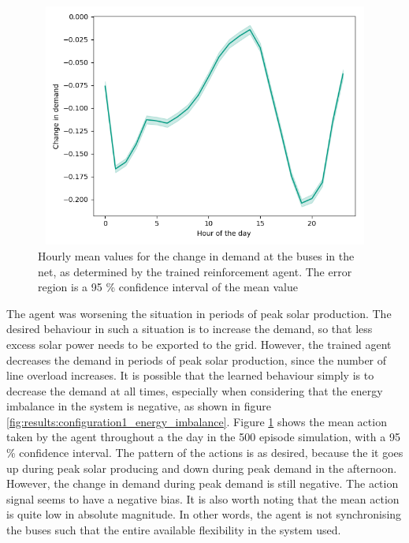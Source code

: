 \documentclass[class=book, crop=false, 11pt]{standalone}
\begin{document}
\begin{figure}[h]
    \center
\includegraphics[height=8cm, width=12cm]{figures/config1_action_hour.png}
    \caption[size = 9]{Hourly mean values for the change in demand at the buses in the net, as determined by the trained reinforcement agent. The error region is a 95 \% confidence interval of the mean value}
    \label{fig:discussion:config1_action_hour}
\end{figure}

The agent was worsening the situation in periods of peak solar production. The desired behaviour in such a situation is to increase the demand, so that less excess solar power needs to be exported to the grid. However, the trained agent decreases the demand in periods of peak solar production, since the number of line overload increases. It is possible that the learned behaviour simply is to decrease the demand at all times, especially when considering that the energy imbalance in the system is negative, as shown in figure \ref{fig:results:configuration1_energy_imbalance}. Figure \ref{fig:discussion:config1_action_hour} shows the mean action taken by the agent throughout a the day in the 500 episode simulation, with a 95 \% confidence interval. The pattern of the actions is as desired, because the it goes up during peak solar producing and down during peak demand in the afternoon. However, the change in demand during peak demand is still negative. The action signal seems to have a negative bias. It is also worth noting that the mean action is quite low in absolute magnitude. In other words, the agent is not synchronising the buses such that the entire available flexibility in the system used.
\end{document}
